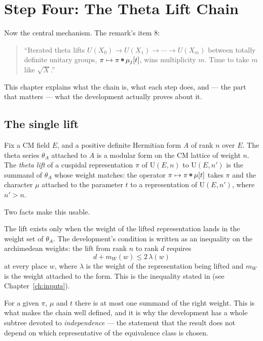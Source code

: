 
\chapter{Step Four: The Theta Lift Chain}
\label{ch:step4}

Now the central mechanism. The remark's item 8:

\begin{quote}
\small
``Iterated theta lifts $U(X_0) \to U(X_1) \to \cdots \to U(X_m)$ between totally
definite unitary groups, $\pi \mapsto \pi \tboxplus \mu_j[t]$, wins multiplicity
$m$. Time to take $m$ like $\sqrt{X}$.''
\end{quote}

This chapter explains what the chain is, what each step does, and --- the
part that matters --- what the development actually proves about it.

\section{The single lift}Fix a CM field $E$, and a positive definite Hermitian form $A$ of rank $n$
over $E$. The theta series $\theta_A$ attached to $A$ is a modular form on the
CM lattice of weight $n$. The \emph{theta lift} of a cuspidal representation
$\pi$ of $\mathrm{U}(E, n)$ to $\mathrm{U}(E, n')$ is the summand of $\theta_A$
whose weight matches: the operator $\pi \mapsto \pi \tboxplus \mu[t]$ takes $\pi$
and the character $\mu$ attached to the parameter $t$ to a representation of
$\mathrm{U}(E, n')$, where $n' > n$.

Two facts make this usable.

\begin{description}[style=nextline,leftmargin=0pt,labelwidth=0pt,labelsep=0pt,font=\sffamily\bfseries\small,
  itemsep=6pt]
\item[Weight matching is a condition.] The lift exists only when the weight
of the lifted representation lands in the weight set of $\theta_A$. The
development's condition is written as an inequality on the archimedean
weights: the lift from rank $n$ to rank $d$ requires
\begin{equation}
d + m_W(w) \le 2\,\lambda(w)
\label{eq:weightineq}
\end{equation}
at every place $w$, where $\lambda$ is the weight of the representation
being lifted and $m_W$ is the weight attached to the form. This is the
inequality stated in  (see
Chapter~\ref{ch:inputs}).
\item[The lift is unique when it exists.] For a given $\pi$, $\mu$ and $t$ there
is at most one summand of the right weight. This is what makes the chain
well defined, and it is why the development has a whole subtree devoted to
\emph{independence} --- the statement that the result does not depend on which
representative of the equivalence class is chosen.
\end{description}

